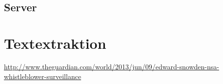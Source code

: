 \documentclass[a4paper,12pt,titlepage=false]{scrreprt}
\begin{document}
\section{Server}
\vspace{.1cm}


\chapter{Textextraktion}


\scriptsize
\vspace{.1cm}
\url{http://www.theguardian.com/world/2013/jun/09/edward-snowden-nsa-whistleblower-surveillance}
\end{document}
